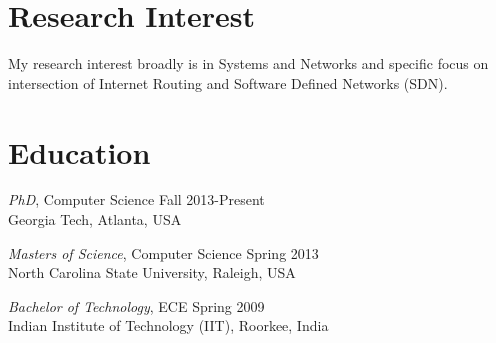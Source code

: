 \documentclass[11pt]{res}
\begin{document}
\thispagestyle{empty} %
\address{3337 Klaus\\
Atlanta, 30308 \\ }
\address{e-mail: agupta80@gatech.edu \\
Website : cc.gatech.edu/agupta80}
\begin{resume}
\section{Research Interest}
My research interest broadly is in Systems and Networks and specific focus on intersection of 
Internet Routing and Software Defined Networks (SDN). 
\section{Education}
{\sl PhD}, Computer Science \hfill Fall 2013-Present\\
Georgia Tech, Atlanta, USA \hspace{0.2in}


{\sl Masters of Science}, Computer Science \hfill Spring 2013\\ 
North Carolina State University, Raleigh, USA \hspace{0.2in}


{\sl Bachelor of Technology}, ECE \hfill Spring 2009\\
Indian Institute of Technology (IIT), Roorkee, India \hspace{0.2in}


\end{resume}
\end{document}
